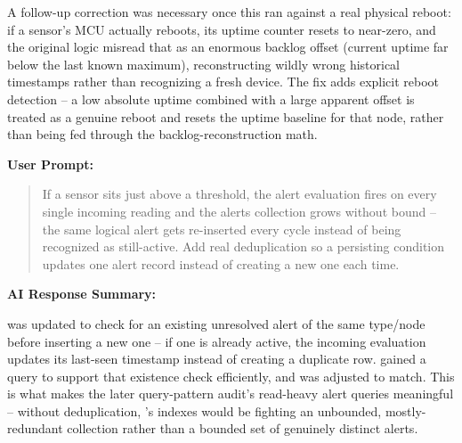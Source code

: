 \documentclass[conference]{IEEEtran}
\begin{document}
A follow-up correction was necessary once this ran against a real physical reboot: if a sensor's MCU actually reboots, its uptime counter resets to near-zero, and the original logic misread that as an enormous backlog offset (current uptime far below the last known maximum), reconstructing wildly wrong historical timestamps rather than recognizing a fresh device. The fix adds explicit reboot detection -- a low absolute uptime combined with a large apparent offset is treated as a genuine reboot and resets the uptime baseline for that node, rather than being fed through the backlog-reconstruction math.

\par\vspace{4pt}\par\vspace{2pt}

\noindent\textbf{User Prompt:}\par

\begin{quote}
If a sensor sits just above a threshold, the alert evaluation fires on every single incoming reading and the alerts collection grows without bound -- the same logical alert gets re-inserted every cycle instead of being recognized as still-active. Add real deduplication so a persisting condition updates one alert record instead of creating a new one each time.
\end{quote}

\noindent\textbf{AI Response Summary:}\par

\texttt{} was updated to check for an existing unresolved alert of the same type/node before inserting a new one -- if one is already active, the incoming evaluation updates its last-seen timestamp instead of creating a duplicate row. \texttt{} gained a query to support that existence check efficiently, and \texttt{} was adjusted to match. This is what makes the later query-pattern audit's read-heavy alert queries meaningful -- without deduplication, \texttt{}'s indexes would be fighting an unbounded, mostly-redundant collection rather than a bounded set of genuinely distinct alerts.

\par\vspace{4pt}\par\vspace{2pt}
\end{document}
